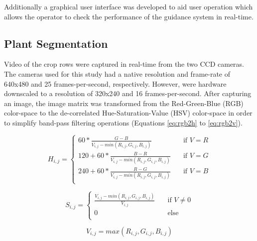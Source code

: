 Additionally a graphical user interface was developed to aid user
operation which allows the operator to check the performance of the
guidance system in real-time.

\subsection{Plant Segmentation}
Video of the crop rows were captured in real-time from the two CCD
cameras. The cameras used for this study had a native resolution and
frame-rate of 640x480 and 25 frames-per-second, respectively. However,
were hardware downscaled to a resolution of 320x240 and 16
frames-per-second. After capturing an image, the image matrix was
transformed from the Red-Green-Blue (RGB) color-space to the
de-correlated Hue-Saturation-Value (HSV) color-space in order to
simplify band-pass filtering operations (Equations \ref{eq:rgb2h} to \ref{eq:rgb2v}).

\begin{equation}
  H_{i,j} =
  \begin{cases}
    60 * \frac{G-B}{V_{i,j}-min(R_{i,j},G_{i,j},B_{i,j})}  & \quad \text{if } V = R \\
    120 + 60 * \frac{B-R}{V_{i,j}-min(R_{i,j},G_{i,j},B_{i,j})}  & \quad \text{if } V = G \\
    240 + 60 * \frac{R-G}{V_{i,j}-min(R_{i,j},G_{i,j},B_{i,j})}  & \quad \text{if } V = B \\
  \end{cases}
  \label{eq:rgb2h}
\end{equation}

\begin{equation}
  S_{i,j} = 
  \begin{cases}
    \frac{V_{i,j}-min(R_{i,j},G_{i,j},B_{i,j})}{V_{i,j}}  & \quad \text{if } V \neq 0 \\
    0  & \quad \text{else}\\
  \end{cases}
  \label{eq:rgb2s}
\end{equation}

\begin{equation}
  V_{i,j} = max(R_{i,j},G_{i,j},B_{i,j})
  \label{eq:rgb2v}
\end{equation}

